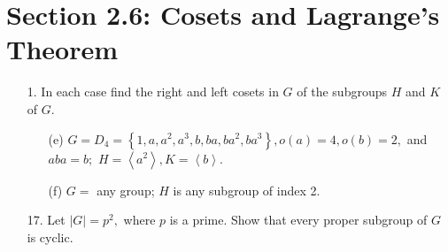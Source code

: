 \documentclass{article}
\begin{document}
\section*{Section 2.6: Cosets and Lagrange's Theorem}
\begin{itemize}
	\item[1.] In each case find the right and left cosets in $G$ of the subgroups $H$ and $K$ of $G.$ 
		\begin{itemize}
			\item[(e)] $G=D_4=\left\{ 1, a, a^2, a^3, b, ba, ba^2, ba^3 \right\}, o(a)=4, o(b)=2,$ and $aba=b;$ $H=\left< a^2\right>, K=\left< b\right>.$

			\item[(f)] $G=$ any group; $H$ is any subgroup of index 2.
				
		\end{itemize}

	\item[17.] Let $|G|=p^2,$ where $p$ is a prime. Show that every proper subgroup of $G$ is cyclic.
		
\end{itemize}
\end{document}
